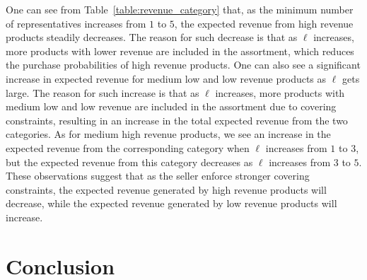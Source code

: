 \documentclass[msom,non-blindrev]{informs3} %
\theoremstyle{definition}
\begin{document}
{One can see from Table~\ref{table:revenue_category} that, as the minimum number of representatives increases from $1$ to $5$, the expected revenue from high revenue products steadily decreases. The reason for such decrease is that as $\ell$ increases, more products with lower revenue are included in the assortment, which reduces the purchase probabilities of high revenue products. One can also see a significant increase in expected revenue for medium low and low revenue products as $\ell$ gets large. The reason for such increase is that as $\ell$ increases, more products with medium low and low revenue are included in the assortment due to covering constraints, resulting in an increase in the total expected revenue from the two categories. As for medium high revenue products, we see an increase in the expected revenue from the corresponding category when $\ell$ increases from $1$ to $3$, but the expected revenue from this category decreases as $\ell$ increases from $3$ to $5$. These observations suggest that as the seller enforce stronger covering constraints, the expected revenue generated by high revenue products will decrease, while the expected revenue generated by low revenue products will increase.



}


\section{Conclusion}
\end{document}

